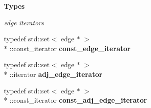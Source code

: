 \begin{Indent}{\bf Types}
\begin{DoxyCompactItemize}
\begin{DoxyCompactList}\small\item\em edge iterators \end{DoxyCompactList}\item 
\hypertarget{classmystl_1_1graph_af3f7ff404779108f31fccec55a84cae2}{typedef std\+::set$<$ edge $\ast$ $>$\\*
\+::const\+\_\+iterator {\bfseries const\+\_\+edge\+\_\+iterator}}\label{classmystl_1_1graph_af3f7ff404779108f31fccec55a84cae2}

\item 
\hypertarget{classmystl_1_1graph_a1eecb1e0d123a8bd3987658cd8da3adb}{typedef std\+::set$<$ edge $\ast$ $>$\\*
\+::iterator {\bfseries adj\+\_\+edge\+\_\+iterator}}\label{classmystl_1_1graph_a1eecb1e0d123a8bd3987658cd8da3adb}

\item 
\hypertarget{classmystl_1_1graph_a78fdafef556df27b9f0c92d87b20a9c1}{typedef std\+::set$<$ edge $\ast$ $>$\\*
\+::const\+\_\+iterator {\bfseries const\+\_\+adj\+\_\+edge\+\_\+iterator}}\label{classmystl_1_1graph_a78fdafef556df27b9f0c92d87b20a9c1}

\end{DoxyCompactItemize}
\end{Indent}
